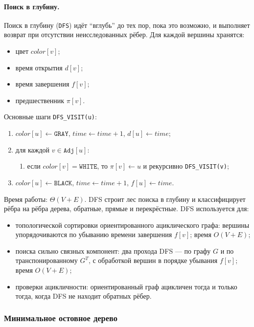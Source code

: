 \documentclass[a4paper,12pt]{article}
\begin{document}
\paragraph*{Поиск в глубину.}
Поиск в глубину (\texttt{DFS}) идёт ``вглубь'' до тех пор, пока это возможно, и выполняет возврат при отсутствии неисследованных рёбер. Для каждой вершины хранятся:
\begin{itemize}
    \item цвет \(color[v]\);
    \item время открытия \(d[v]\);
    \item время завершения \(f[v]\);
    \item предшественник \(\pi[v]\).
\end{itemize}
Основные шаги \texttt{DFS\_VISIT(u)}:
\begin{enumerate}
    \item \(color[u]\leftarrow\texttt{GRAY}\), \(time\leftarrow time+1\), \(d[u]\leftarrow time\);
    \item для каждой \(v\in\texttt{Adj}[u]\):
    \begin{enumerate}
        \item если \(color[v]=\texttt{WHITE}\), то \(\pi[v]\leftarrow u\) и рекурсивно \texttt{DFS\_VISIT(v)};
    \end{enumerate}
    \item \(color[u]\leftarrow\texttt{BLACK}\), \(time\leftarrow time+1\), \(f[u]\leftarrow time\).
\end{enumerate}
Время работы: \(\Theta(V+E)\). DFS строит лес поиска в глубину и классифицирует рёбра на рёбра дерева, обратные, прямые и перекрёстные. DFS используется для:
\begin{itemize}
    \item топологической сортировки ориентированного ациклического графа: вершины упорядочиваются по убыванию времени завершения \(f[v]\); время \(O(V+E)\);
    \item поиска сильно связных компонент: два прохода DFS — по графу \(G\) и по транспонированному \(G^T\), с обработкой вершин в порядке убывания \(f[v]\); время \(O(V+E)\);
    \item проверки ацикличности: ориентированный граф ацикличен тогда и только тогда, когда DFS не находит обратных рёбер.
\end{itemize}

\subsubsection*{Минимальное остовное дерево}
\end{document}
